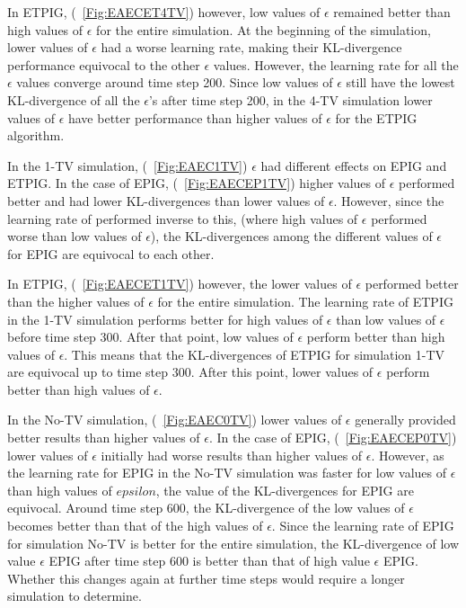 \documentclass[12pt]{thesis}
\begin{document}

In ETPIG, (\figurename~\ref{Fig:EAECET4TV}) however, low values of $\epsilon$ remained better than high values of $\epsilon$ for the entire simulation. At the beginning of the simulation, lower values of $\epsilon$ had a worse learning rate, making their KL-divergence performance equivocal to the other $\epsilon$ values. However, the learning rate for all the $\epsilon$ values converge around time step 200. Since low values of $\epsilon$ still have the lowest KL-divergence of all the $\epsilon$'s after time step 200, in the 4-TV simulation lower values of $\epsilon$ have better performance than higher values of $\epsilon$ for the ETPIG algorithm.

In the 1-TV simulation, (\figurename~\ref{Fig:EAEC1TV}) $\epsilon$ had different effects on EPIG and ETPIG. In the case of EPIG, (\figurename~\ref{Fig:EAECEP1TV}) higher values of $\epsilon$ performed better and had lower KL-divergences than lower values of $\epsilon$. However, since the learning rate of performed inverse to this, (where high values of $\epsilon$ performed worse than low values of $\epsilon$), the KL-divergences among the different values of $\epsilon$ for EPIG are equivocal to each other.

In ETPIG, (\figurename~\ref{Fig:EAECET1TV}) however, the lower values of $\epsilon$ performed better than the higher values of $\epsilon$ for the entire simulation. The learning rate of ETPIG in the 1-TV simulation performs better for high values of $\epsilon$ than low values of $\epsilon$ before time step 300. After that point, low values of $\epsilon$ perform better than high values of $\epsilon$. This means that the KL-divergences of ETPIG for simulation 1-TV are equivocal up to time step 300. After this point, lower values of $\epsilon$ perform better than high values of $\epsilon$.


In the No-TV simulation, (\figurename~\ref{Fig:EAEC0TV}) lower values of $\epsilon$ generally provided better results than higher values of $\epsilon$. In the case of EPIG, (\figurename~\ref{Fig:EAECEP0TV}) lower values of $\epsilon$ initially had worse results than higher values of $\epsilon$. However, as the learning rate for EPIG in the No-TV simulation was faster for low values of $\epsilon$ than high values of $epsilon$, the value of the KL-divergences for EPIG are equivocal. Around time step 600, the KL-divergence of the low values of $\epsilon$ becomes better than that of the high values of $\epsilon$. Since the learning rate of EPIG for simulation No-TV is better for the entire simulation, the KL-divergence of low value $\epsilon$ EPIG after time step 600 is better than that of high value $\epsilon$ EPIG. Whether this changes again at further time steps would require a longer simulation to determine.
\end{document}
